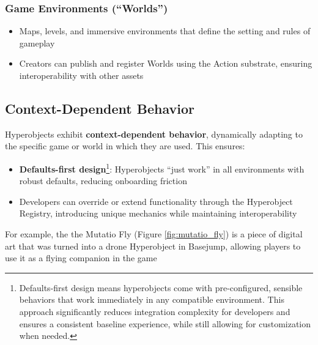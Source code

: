 \subsubsection{Game Environments (``Worlds'')}
\begin{itemize}
\item Maps, levels, and immersive environments that define the setting and rules of gameplay
\item Creators can publish and register Worlds using the Action substrate, ensuring interoperability with other assets
\end{itemize}

\subsection{Context-Dependent Behavior}

Hyperobjects exhibit \textbf{context-dependent behavior}, dynamically adapting to the specific game or world in which they are used. This ensures:

\begin{itemize}
\item \textbf{Defaults-first design}\footnote{Defaults-first design means hyperobjects come with pre-configured, sensible behaviors that work immediately in any compatible environment. This approach significantly reduces integration complexity for developers and ensures a consistent baseline experience, while still allowing for customization when needed.}: Hyperobjects ``just work'' in all environments with robust defaults, reducing onboarding friction
\item Developers can override or extend functionality through the Hyperobject Registry, introducing unique mechanics while maintaining interoperability
\end{itemize}

For example, the the Mutatio Fly (Figure \ref{fig:mutatio_fly}) is a piece of digital art that was turned into a drone Hyperobject in Basejump, allowing players to use it as a flying companion in the game

